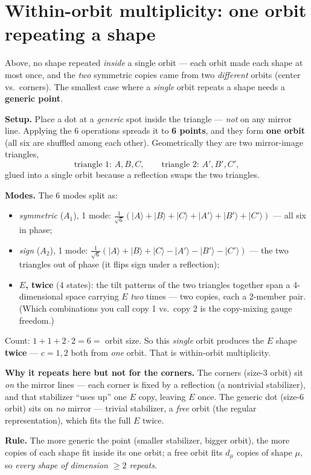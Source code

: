 \documentclass[11pt]{article}
\newcommand{\ket}[1]{\lvert #1\rangle}
\begin{document}
\section{Within-orbit multiplicity: one orbit repeating a shape}
Above, no shape repeated \emph{inside} a single orbit --- each orbit made each shape at most once, and
the \emph{two} symmetric copies came from two \emph{different} orbits (center vs.\ corners). The smallest
case where a \emph{single} orbit repeats a shape needs a \textbf{generic point}.

\textbf{Setup.} Place a dot at a \emph{generic} spot inside the triangle --- \emph{not} on any mirror
line. Applying the 6 operations spreads it to \textbf{6 points}, and they form \textbf{one orbit} (all
six are shuffled among each other). Geometrically they are two mirror-image triangles,
\[ \text{triangle 1: } A,B,C, \qquad \text{triangle 2: } A',B',C', \]
glued into a single orbit because a reflection swaps the two triangles.

\textbf{Modes.} The 6 modes split as:
\begin{itemize}\itemsep1pt
\item \emph{symmetric} ($A_1$), 1 mode: $\tfrac1{\sqrt6}(\ket A+\ket B+\ket C+\ket{A'}+\ket{B'}+\ket{C'})$
      --- all six in phase;
\item \emph{sign} ($A_2$), 1 mode: $\tfrac1{\sqrt6}(\ket A+\ket B+\ket C-\ket{A'}-\ket{B'}-\ket{C'})$ ---
      the two triangles out of phase (it flips sign under a reflection);
\item \textbf{$E$, twice} (4 states): the tilt patterns of the two triangles together span a
      4-dimensional space carrying $E$ \emph{two} times --- two copies, each a 2-member pair. (Which
      combinations you call copy 1 vs.\ copy 2 is the copy-mixing gauge freedom.)
\end{itemize}
Count: $1+1+2\cdot2 = 6 =$ orbit size. So this \emph{single} orbit produces the $E$ shape
\textbf{twice} --- $c=1,2$ both from \emph{one} orbit. That is within-orbit multiplicity.

\textbf{Why it repeats here but not for the corners.} The corners (size-3 orbit) sit \emph{on} the mirror
lines --- each corner is fixed by a reflection (a nontrivial stabilizer), and that stabilizer ``uses
up'' one $E$ copy, leaving $E$ once. The generic dot (size-6 orbit) sits on \emph{no} mirror --- trivial
stabilizer, a \emph{free} orbit (the regular representation), which fits the full $E$ twice.

\textbf{Rule.} The more generic the point (smaller stabilizer, bigger orbit), the more copies of each
shape fit inside its one orbit; a free orbit fits $d_\mu$ copies of shape $\mu$, so \emph{every shape of
dimension $\ge2$ repeats}.
\end{document}

